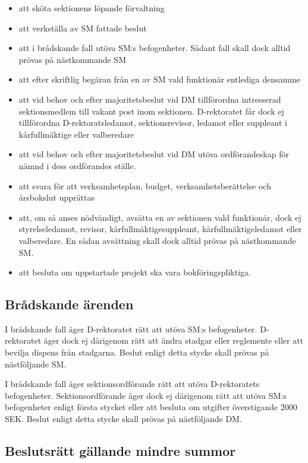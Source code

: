 \documentclass{dgovdoc}
\begin{document}
\begin{itemize}
  \item att sköta sektionens löpande förvaltning
  \item att verkställa av SM fattade beslut
  \item att i brådskande fall utöva SM:s befogenheter. Sådant fall skall dock
    alltid prövas på nästkommande SM
  \item att efter skriftlig begäran från en av SM vald funktionär entlediga
    densamme
  \item att vid behov och efter majoritetsbeslut vid DM tillförordna
    intresserad sektionsmedlem till vakant post inom sektionen. D-rektoratet
    får dock ej tillförordna D-rektoratsledamot, sektionsrevisor, ledamot eller
    suppleant i kårfullmäktige eller valberedare
  \item att vid behov och efter majoritetsbeslut vid DM utöva ordförandeskap
    för nämnd i dess ordförandes ställe.
  \item att svara för att verksamhetsplan, budget, verksamhetsberättelse och
    årsbokslut upprättas
  \item att, om så anses nödvändigt, avsätta en av sektionen vald funktionär,
    dock ej styrelseledamot, revisor, kårfullmäktigesuppleant,
    kårfullmäktigeledamot eller valberedare. En sådan avsättning skall dock
    alltid prövas på nästkommande SM.
  \item att besluta om uppstartade projekt ska vara bokföringspliktiga.
\end{itemize}

\subsection{Brådskande ärenden}

I brådskande fall äger D-rektoratet rätt att utöva SM:s befogenheter.
D-rektoratet äger dock ej därigenom rätt att ändra stadgar eller reglemente
eller att bevilja dispens från stadgarna. Beslut enligt detta stycke skall
prövas på nästföljande SM.

I brådskande fall äger sektionsordförande rätt att utöva D-rektoratets
befogenheter. Sektionsordförande äger dock ej därigenom rätt att utöva SM:s
befogenheter enligt första stycket eller att besluta om utgifter överstigande
2000 SEK. Beslut enligt detta stycke skall prövas på nästföljande DM.

\subsection{Beslutsrätt gällande mindre summor}
\end{document}
